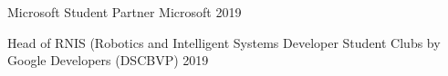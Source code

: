 \smallskip

\begin{cvhonors}

  \cvhonor
    {Microsoft Student Partner} %
    {Microsoft} %
    {} %
    {2019} %

  \cvhonor
    {Head of RNIS (Robotics and Intelligent Systems} %
    {Developer Student Clubs by Google Developers (DSCBVP)} %
    {} %
    {2019} %

\end{cvhonors}
